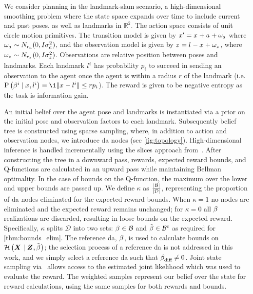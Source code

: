 We consider planning in the landmark-\gls{slam} scenario, a high-dimensional smoothing problem where the state space expands over time to include current and past poses, as well as landmarks in $\mathbb{R}^2$. The action space consists of unit circle motion primitives. The transition model is given by $x_{}^\prime=x_{}+{a_{}}+\omega_{{a_{}}}$ where $\omega_{{a_{}}}\sim N_{r_a}(0,I\sigma_{{a_{}}}^2)$, and the observation model is given by $z_{}^{}=l^{}-x_{}+\omega_{z_{}^{}}$, where $\omega_{z_{}^{}}\sim N_{r_{z_{}^{}}}(0,I\sigma_{z_{}^{}}^2)$. Observations are relative position between poses and landmarks. Each landmark $l^{i}$ has probability $p_i$ to succeed in sending an observation to the agent once the agent is within a radius $r$ of the landmark (i.e. $\probcond{\da{}{i}}{\state{},\landmark{i}}=\1{\norm{\state{}-\landmark{i}}\leq r}p_i$). The reward is given to be negative entropy as the task is information gain.

An initial belief over the agent pose and landmarks is instantiated via a prior on the initial pose and observation factors to each landmark. Subsequently belief tree is constructed using sparse sampling, where, in addition to action and observation nodes, we introduce \gls{da} nodes (see \cref{fig:topology}). High-dimensional inference is handled incrementally using the slices approach from~\cite{Shienman24arxiv}. After constructing the tree in a downward pass, rewards, expected reward bounds, and Q-functions are calculated in an upward pass while maintaining Bellman optimality. In the case of bounds on the Q-function, the maximum over the lower and upper bounds are passed up. We define $\kappa$ as $\frac{\lvert\mathcal B\rvert}{\lvert\mathcal{D}\rvert}$, representing the proportion of \gls{da} nodes eliminated for the expected reward bounds.  When $\kappa=1$ no nodes are eliminated and the expected reward remains unchanged; for $\kappa=0$ all $\beta_{}^{}$ realizations are discarded, resulting in loose bounds on the expected reward. Specifically, $\kappa$ splits $\mathcal{D}$ into two sets: $\beta_{}^{}\in\mathcal B$ and $\tilde{\beta_{}^{}}\in{\ensuremath{\mathcal B}}^{\mathsf{c}}$ as required for \autoref{thm:bounds_elim}. The reference \gls{da}, $\beta_{}^{}$, is used to calculate bounds on $\mathcal{H}\left({\boldsymbol X_{}}\mid{\ensuremath{\boldsymbol Z_{}},\tilde{\ensuremath{\beta_{}^{}}}}\right)$; the selection process of a reference \gls{da} is not addressed in this work, and we simply select a reference \gls{da} such that $\beta_{\textup{diff}}^{}\neq0$. Joint state sampling via~\cite{Shienman24arxiv} allows access to the estimated joint likelihood which was used to evaluate the reward. The weighted samples represent our belief over the state for reward calculations, using the same samples for both rewards and bounds.

